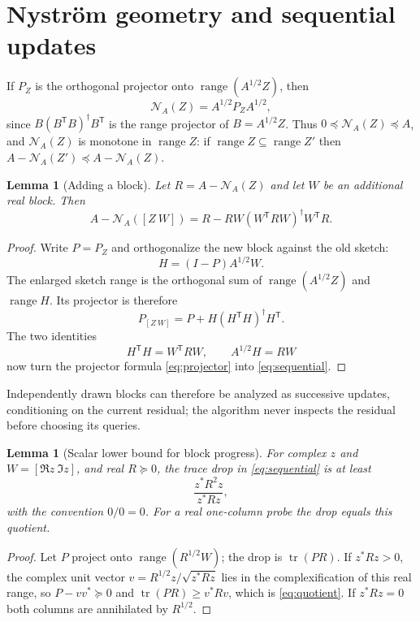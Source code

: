 \documentclass[11pt,a4paper]{article}
\newtheorem{lemma}[theorem]{Lemma}
\theoremstyle{definition}\newtheorem{definition}[theorem]{Definition}
\theoremstyle{remark}\newtheorem{remark}[theorem]{Remark}
\numberwithin{equation}{section}
\newcommand{\tr}{\operatorname{tr}}
\newcommand{\range}{\operatorname{range}}
\newcommand{\Nys}{\mathcal N}
\begin{document}
\section{Nystr\"om geometry and sequential updates}\label{sec:geometry}
If $P_Z$ is the orthogonal projector onto $\range(A^{1/2}Z)$, then
\begin{equation}\label{eq:projector}
 \Nys_A(Z)=A^{1/2}P_ZA^{1/2},
\end{equation}
since $B(B^{\mathsf T}B)^\dagger B^{\mathsf T}$ is the range projector of $B=A^{1/2}Z$.
Thus $0\preceq\Nys_A(Z)\preceq A$, and $\Nys_A(Z)$ is monotone in $\range Z$:
if $\range Z\subseteq\range Z'$ then $A-\Nys_A(Z')\preceq A-\Nys_A(Z)$.

\begin{lemma}[Adding a block]\label{lem:sequential}
Let $R=A-\Nys_A(Z)$ and let $W$ be an additional real block. Then
\begin{equation}\label{eq:sequential}
 A-\Nys_A([Z\ W])=R-RW(W^{\mathsf T}RW)^\dagger W^{\mathsf T}R .
\end{equation}
\end{lemma}
\begin{proof}
Write \(P=P_Z\) and orthogonalize the new block against the old sketch:
\[
 H=(I-P)A^{1/2}W.
\]
The enlarged sketch range is the orthogonal sum of
\(\range(A^{1/2}Z)\) and \(\range H\). Its projector is therefore
\[
 P_{[Z\ W]}=P+H(H^{\mathsf T}H)^\dagger H^{\mathsf T}.
\]
The two identities
\[
 H^{\mathsf T}H=W^{\mathsf T}RW,
 \qquad A^{1/2}H=RW
\]
now turn the projector formula \eqref{eq:projector} into
\eqref{eq:sequential}.
\end{proof}

Independently drawn blocks can therefore be analyzed as successive updates,
conditioning on the current residual; the algorithm never inspects the
residual before choosing its queries.

\begin{lemma}[Scalar lower bound for block progress]\label{lem:block}
For complex $z$ and $W=[\Re z\ \Im z]$, and real $R\succeq0$, the trace drop in
\eqref{eq:sequential} is at least
\begin{equation}\label{eq:quotient}
 \frac{z^*R^2z}{z^*Rz},
\end{equation}
with the convention $0/0=0$. For a real one-column probe the drop equals this quotient.
\end{lemma}
\begin{proof}
Let $P$ project onto $\range(R^{1/2}W)$; the drop is $\tr(PR)$. If $z^*Rz>0$,
the complex unit vector $v=R^{1/2}z/\sqrt{z^*Rz}$ lies in the complexification of
this real range, so $P-vv^*\succeq0$ and $\tr(PR)\ge v^*Rv$, which is
\eqref{eq:quotient}. If $z^*Rz=0$ both columns are annihilated by $R^{1/2}$.
\end{proof}
\end{document}
